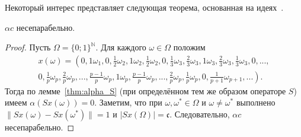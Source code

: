 Некоторый интерес представляет следующая теорема,
основанная на идеях~\cite{usachev2009_phd_vsu}.

\begin{theorem}
	$\alpha c$ несепарабельно.
\end{theorem}

\begin{proof}
	Пусть $\Omega = \{0;1\}^{\mathbb{N}}$.
	Для каждого $\omega\in\Omega$ положим
	\begin{multline}
		\label{eq:x_omega_alpha_c}
		x(\omega)=\left(
			0, 1\omega_1,
			0, \frac{1}{2}\omega_2, 1\omega_2, \frac{1}{2}\omega_2,
			0, \frac{1}{3}\omega_3, \frac{2}{3}\omega_3, 1\omega_3, \frac{2}{3}\omega_3, \frac{1}{3}\omega_3,
			0, ...,
		\right. \\ \left.
			0, \frac{1}{p}\omega_p, \frac{2}{p}\omega_p, ..., \frac{p-1}{p}\omega_p, 1\omega_p,
				\frac{p-1}{p}\omega_p, ..., \frac{2}{p}\omega_p, \frac{1}{p}\omega_p,
			0, \frac{1}{p+1}\omega_{p+1}, ...
		\right).
	\end{multline}
	Тогда по лемме~\ref{thm:alpha_S} (при определённом тем же образом операторе $S$) имеем
	$\alpha(Sx(\omega)) = 0$.
	Заметим, что при $\omega,\omega^* \in \Omega$ и $\omega\neq\omega^*$ выполнено
	$\|Sx(\omega)-Sx(\omega^*)\|=1$ и $|Sx(\Omega)|=\mathfrak{c}$.
	Следовательно, $\alpha c$ несепарабельно.
\end{proof}


